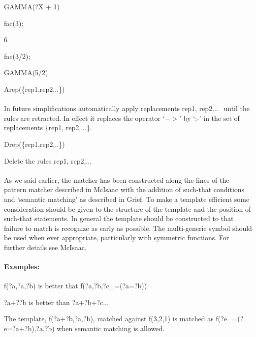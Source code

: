  GAMMA(?X + 1)



 fac(3);

 6



 fac(3/2);

 GAMMA(5/2)



Arep(\{rep1,rep2,..\}) \\
\ \\
In future simplifications automatically apply replacements rep1,
rep2...~ until the rules are retracted. In effect it replaces the
operator `$->$' by `:-' in the set of replacements \{rep1, rep2,...\}.



Drep(\{rep1,rep2,..\})



 Delete the rules rep1, rep2,... \\
\ \\
As we said earlier, the matcher has been constructed along the lines of the
pattern matcher described in McIsaac with the addition of such-that
conditions and `semantic matching' as described in Grief. To make a
template efficient some consideration should be given to the structure of
the template and the position of such-that statements. In general the
template should be constructed to that failure to match is recognize as
early as possible. The multi-generic symbol should be used when ever
appropriate, particularly with symmetric functions. For further details
see McIsaac. \\
\ \\
{\bf Examples:} \\
\ \\
 f(?a,?a,?b) is better that f(?a,?b,?c\_=(?a=?b))

 ?a+??b is better than ?a+?b+?c...

The template, f(?a+?b,?a,?b), matched against f(3,2,1) is
matched as f(?e\_=(?e=?a+?b),?a,?b) when semantic matching is allowed. \\


